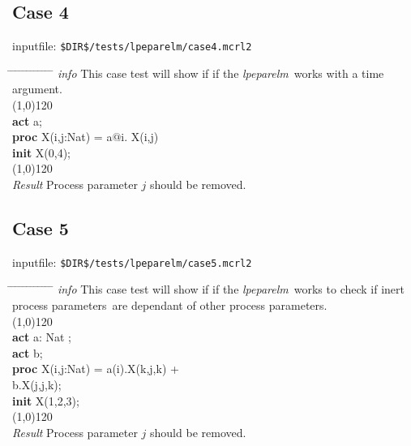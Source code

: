 \documentclass[a4paper,10pt]{article}
\theoremstyle{plain}
\theoremstyle{definition}
\newcommand{\tool}{\textit{lpeparelm}}
\newcommand{\ti}{\textit}
\newcommand{\tb}{\textbf}
\newcommand{\pps}{process parameters}
\newcommand{\tabw}{\hspace*{15.mm} \= \hspace*{20.mm} \= \hspace*{5.mm} \= \hspace*{5.mm} \= \hspace*{5.mm} \= \hspace*{5.mm}  \= \hspace*{5.mm}  \= \hspace*{5.mm}  \= \hspace*{5.mm} \= \hspace*{5.mm} \= \hspace*{5.mm}  \= \hspace*{5.mm}  \= \hspace*{5.mm}\kill}
\begin{document}
\subsection*{Case 4}
inputfile: \verb"$DIR$/tests/lpeparelm/case4.mcrl2"
\begin{tabbing}
\tabw
\ti{info} \> This case test will show if if the \tool\ works with a time argument.\\
\line(1,0){120}\\
\tb{act} \> a; \\
\tb{proc} \> X(i,j:Nat) = \> a$@$i. X(i,j)\\
\tb{init} \> X(0,4); \\  
\line(1,0){120}\\
\ti{Result} \> Process parameter $j$ should be removed.\\ 
\end{tabbing}

\subsection*{Case 5}
inputfile: \verb"$DIR$/tests/lpeparelm/case5.mcrl2"
\begin{tabbing}
\tabw
\ti{info} \> This case test will show if if the \tool\ works to check if inert \pps\ are dependant of other \pps .\\
\line(1,0){120}\\
\tb{act} \> a: Nat ; \\
\tb{act} \> b; \\
\tb{proc} \> X(i,j:Nat) = \> a(i).X(k,j,k) + \\
          \> \>              b.X(j,j,k);\\
\tb{init} \> X(1,2,3); \\  
\line(1,0){120}\\
\ti{Result} \> Process parameter $j$ should be removed.\\ 
\end{tabbing}
\end{document}
